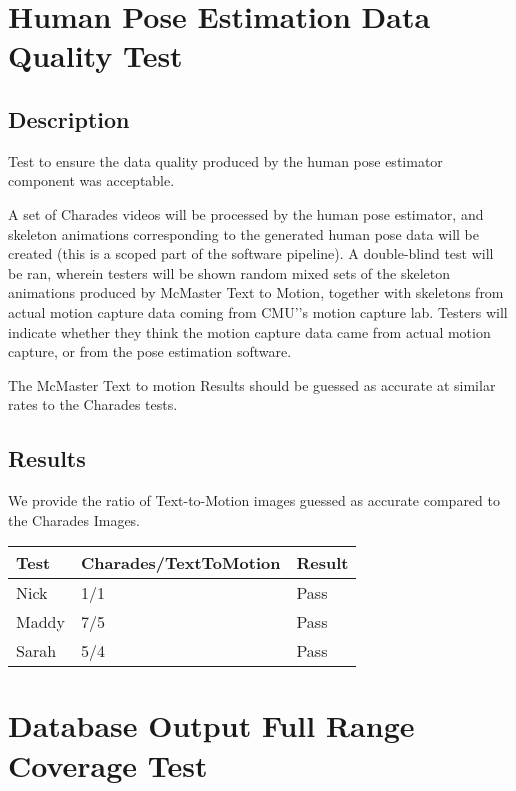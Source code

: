 \documentclass{scrreprt}
\begin{document}
\section{Human Pose Estimation Data Quality Test}
\subsection{Description}

Test to ensure the data quality produced by the human pose estimator component
was acceptable.

A set of Charades videos will be processed by the human pose estimator, and
skeleton animations corresponding to the generated human pose data will be
created (this is a scoped part of the software pipeline). A double-blind test
will be ran, wherein testers will be shown random mixed sets of the skeleton
animations produced by McMaster Text to Motion, together with skeletons from
actual motion capture data coming from CMU'’s motion capture lab. Testers will
indicate whether they think the motion capture data came from actual motion
capture, or from the pose estimation software.

The McMaster Text to motion Results should be guessed as accurate at similar
rates to the Charades tests.

\subsection{Results}

We provide the ratio of Text-to-Motion images guessed as accurate compared to
the Charades Images.

\begin{table}[H]
        \centering
        \begin{tabular}{||p{2.5cm}|p{5.0cm}|p{2.5cm}||}
                \hline
                \textbf Test & \textbf Charades/TextToMotion & \textbf Result\\
                \hline\hline
                Nick &  1/1 & Pass\\
                \hline
                Maddy &  7/5  & Pass\\
                \hline
                Sarah & 5/4 & Pass\\
                \hline
        \end{tabular}
\end{table}

\section{Database Output Full Range Coverage Test}
\end{document}
